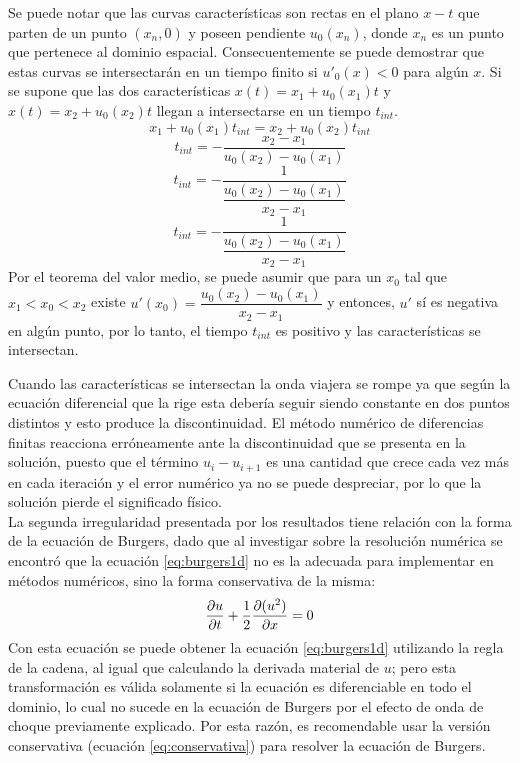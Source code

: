 \documentclass[12pt]{article}
\begin{document}
	Se puede notar que las curvas características son rectas en el plano $x-t$ que parten de un punto $(x_{n}, 0)$ y poseen pendiente $u_{0}(x_n)$, donde $x_n$ es un punto que pertenece al dominio espacial. Consecuentemente se puede demostrar que estas curvas se intersectarán en un tiempo finito si $u'_{0}(x) < 0$ para algún $x$. Si se supone que las dos características $x(t) = x_{1}+u_{0}(x_1)t$ y $x(t) = x_{2}+u_{0}(x_2)t$ llegan a intersectarse en un tiempo $t_{int}$.
	\begin{equation}
		x_{1}+u_{0}(x_1)t_{int} = x_{2}+u_{0}(x_2)t_{int}
	\end{equation}
	\begin{equation}
		t_{int} = -\frac{x_2-x_1}{u_{0}(x_2) - u_{0}(x_1)}
	\end{equation}
	\begin{equation}
		t_{int} = -\dfrac{1}{\dfrac{u_{0}(x_2) - u_{0}(x_1)}{x_2-x_1}}
	\end{equation}
	\begin{equation}
		t_{int} = -\dfrac{1}{\dfrac{u_{0}(x_2) - u_{0}(x_1)}{x_2-x_1}}
	\end{equation}
	Por el teorema del valor medio, se puede asumir que para un $x_0$ tal que $x_1 < x_0 < x_2$ existe $u'(x_0)=\dfrac{u_{0}(x_2) - u_{0}(x_1)}{x_2-x_1}$ y entonces, $u'$ sí es negativa en algún punto, por lo tanto, el tiempo $t_{int}$ es positivo y las características se intersectan.
	
	Cuando las características se intersectan la onda viajera se rompe ya que según la ecuación diferencial que la rige esta debería seguir siendo constante en dos puntos distintos y esto produce la discontinuidad. El método numérico de diferencias finitas reacciona erróneamente ante la discontinuidad que se presenta en la solución, puesto que el término $u_{i}-u_{i+1}$ es una cantidad que crece cada vez más en cada iteración y el error numérico ya no se puede despreciar, por lo que la solución pierde el significado físico.
	\\
	La segunda irregularidad presentada por los resultados tiene relación con la forma de la ecuación de Burgers, dado que al investigar sobre la resolución numérica se encontró que la ecuación \ref{eq:burgers1d} no es la adecuada para implementar en métodos numéricos, sino la forma conservativa de la misma:
	\begin{equation}
		\pdv{u}{t} + \frac{1}{2}\pdv{(u^2)}{x} = 0
		\label{eq:conservativa}
	\end{equation}
	Con esta ecuación se puede obtener la ecuación \ref{eq:burgers1d} utilizando la regla de la cadena, al igual que calculando la derivada material de $u$; pero esta transformación es válida solamente si la ecuación es diferenciable en todo el dominio, lo cual no sucede en la ecuación de Burgers por el efecto de onda de choque previamente explicado. Por esta razón, es recomendable usar la versión conservativa (ecuación \ref{eq:conservativa}) para resolver la ecuación de Burgers.
	
\end{document}
